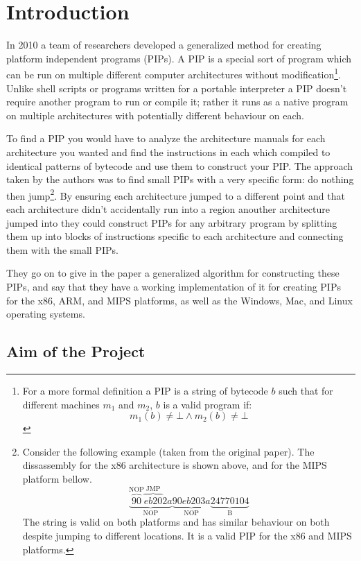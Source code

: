\section{Introduction}

In 2010 a team of researchers developed a generalized method for
creating platform independent programs (PIPs)\citep{Brumley2010}. A PIP
is a special sort of program which can be run on multiple different
computer architectures without modification\footnote{For a more formal
  definition a PIP is a string of bytecode $b$ such that for different
  machines $m_1$ and $m_2$, $b$ is a valid program if:
  \[m_1(b) \not = \bot \wedge m_2(b) \not =\bot\]}. Unlike shell scripts
or programs written for a portable interpreter a PIP doesn't require
another program to run or compile it; rather it runs as a native program
on multiple architectures with potentially different behaviour on each.

To find a PIP you would have to analyze the architecture manuals for
each architecture you wanted and find the instructions in each which
compiled to identical patterns of bytecode and use them to construct
your PIP. The approach taken by the authors was to find small PIPs with
a very specific form: do nothing then jump\footnote{Consider the
  following example (taken from the original paper). The dissassembly
  for the x86 architecture is shown above, and for the MIPS platform
  bellow. \[\underbrace{\overbrace{90}^{\text{NOP}}
                                \overbrace{eb20}^{\text{JMP}}
                                2a
                               }_{\text{NOP}} 
        \underbrace{90eb203a}_{\text{NOP}}
        \underbrace{24770104}_{\text{B}}\] The string is valid on both
  platforms and has similar behaviour on both despite jumping to
  different locations. It is a valid PIP for the x86 and MIPS platforms.}.
By ensuring each architecture jumped to a different point and that each
architecture didn't accidentally run into a region anouther architecture
jumped into they could construct PIPs for any arbitrary program by
splitting them up into blocks of instructions specific to each
architecture and connecting them with the small PIPs.

They go on to give in the paper a generalized algorithm for constructing
these PIPs, and say that they have a working implementation of it for
creating PIPs for the x86, ARM, and MIPS platforms, as well as the
Windows, Mac, and Linux operating systems.

\subsection{Aim of the Project}

